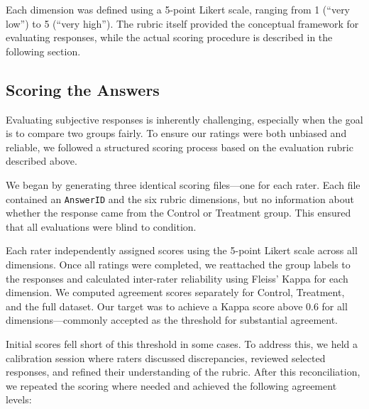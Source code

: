 \documentclass[sigconf, authorversion, nonacm, screen]{acmart}
\begin{document}
Each dimension was defined using a 5-point Likert scale, ranging from 1 (``very low'') to 5 (``very high''). The rubric itself provided the conceptual framework for evaluating responses, while the actual scoring procedure is described in the following section.


\subsection{Scoring the Answers}
Evaluating subjective responses is inherently challenging, especially when the goal is to compare two groups fairly. To ensure our ratings were both unbiased and reliable, we followed a structured scoring process based on the evaluation rubric described above.

We began by generating three identical scoring files---one for each rater. Each file contained an \texttt{AnswerID} and the six rubric dimensions, but no information about whether the response came from the Control or Treatment group. This ensured that all evaluations were blind to condition.

Each rater independently assigned scores using the 5-point Likert scale across all dimensions. Once all ratings were completed, we reattached the group labels to the responses and calculated inter-rater reliability using Fleiss' Kappa for each dimension. We computed agreement scores separately for Control, Treatment, and the full dataset. Our target was to achieve a Kappa score above 0.6 for all dimensions---commonly accepted as the threshold for substantial agreement.

Initial scores fell short of this threshold in some cases. To address this, we held a calibration session where raters discussed discrepancies, reviewed selected responses, and refined their understanding of the rubric. After this reconciliation, we repeated the scoring where needed and achieved the following agreement levels:

\begin{table}[H]
\centering
\caption{Fleiss' Kappa Scores by Dimension and Group}
\label{tab:kappa}
\end{table}
\end{document}
